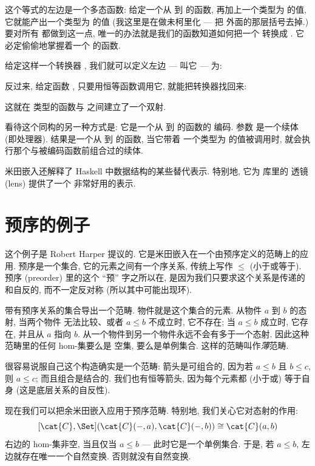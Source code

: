 这个等式的左边是一个多态函数: 给定一个从  到  的函数, 再加上一个类型为
 的值, 它就能产出一个类型为  的值 (我这里是在做未柯里化 --- 把 
外面的那层括号去掉.) 要对所有  都做到这一点, 唯一的办法就是我们的函数知道如何把一个
 转换成 . 它必定偷偷地掌握着一个  的函数.

给定这样一个转换器 , 我们就可以定义左边 --- 叫它  --- 为:

反过来, 给定函数 , 只要用恒等函数调用它, 就能把转换器找回来:

这就在  类型的函数与  之间建立了一个双射.

看待这个同构的另一种方式是: 它是一个从  到  的函数的  编码.
参数  是一个续体 (即处理器). 结果是一个从  到  的函数, 当它带着
一个类型为  的值被调用时, 就会执行那个与被编码函数前组合过的续体.

米田嵌入还解释了 Haskell 中数据结构的某些替代表示. 特别地, 它为  库里的
透镜 (lens) 提供了一个
{非常好用的表示}.

\section{预序的例子}

这个例子是 Robert Harper 提议的. 它是米田嵌入在一个由预序定义的范畴上的应用. 预序是一个集合,
它的元素之间有一个序关系, 传统上写作 $\leqslant$ (小于或等于). 预序 (preorder) 里的这个 ``预''
字之所以在, 是因为我们只要求这个关系是传递的和自反的, 而不一定反对称 (所以其中可能出现环).

带有预序关系的集合导出一个范畴. 物件就是这个集合的元素. 从物件 $a$ 到 $b$ 的态射, 当两个物件
无法比较、或者 $a \leqslant b$ 不成立时, 它不存在; 当 $a \leqslant b$ 成立时, 它存在, 并且从
$a$ 指向 $b$. 从一个物件到另一个物件永远不会有多于一个态射. 因此这种范畴里的任何 hom-集要么是
空集, 要么是单例集合. 这样的范畴叫作\emph{薄}范畴.

很容易说服自己这个构造确实是一个范畴: 箭头是可组合的, 因为若 $a \leqslant b$ 且 $b \leqslant c$, 则
$a \leqslant c$; 而且组合是结合的. 我们也有恒等箭头, 因为每个元素都 (小于或)
等于自身 (这是底层关系的自反性).

现在我们可以把余米田嵌入应用于预序范畴. 特别地, 我们关心它对态射的作用:
\[[\cat{C}, \Set](\cat{C}(-, a), \cat{C}(-, b)) \cong \cat{C}(a, b)\]
右边的 hom-集非空, 当且仅当 $a \leqslant b$ --- 此时它是一个单例集合. 于是, 若
$a \leqslant b$, 左边就存在唯一一个自然变换. 否则就没有自然变换.

